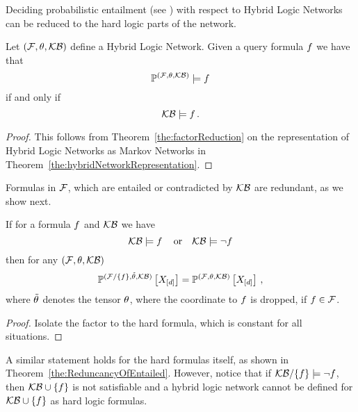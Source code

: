 
Deciding probabilistic entailment (see ) with respect to Hybrid Logic Networks can be reduced to the hard logic parts of the network.

\begin{theorem}\label{the:hlnEntailmentReduction}
	Let $(\mathcal{F},\theta,\mathcal{KB})$ define a Hybrid Logic Network.
	Given a query formula $f$ we have that 
		\[ \mathbb{P}^{(\mathcal{F},\theta,\mathcal{KB})} \models f \]
	if and only if
		\[ \mathcal{KB} \models f \, . \]
\end{theorem}
\begin{proof}
	This follows from Theorem~\ref{the:factorReduction} on the representation of Hybrid Logic Networks as Markov Networks in Theorem~\ref{the:hybridNetworkRepresentation}.
\end{proof}


Formulas in $\mathcal{F}$, which are entailed or contradicted by $\mathcal{KB}$ are redundant, as we show next.

\begin{theorem}%
	If for a formula $f$ and $\mathcal{KB}$ we have 
		\[ \mathcal{KB} \models f \, \quad \text{or} \quad \mathcal{KB} \models \lnot f \]
	then for any $(\mathcal{F},\theta,\mathcal{KB})$
		\[ \mathbb{P}^{(\mathcal{F}/\{f\},\tilde{\theta},\mathcal{KB})}\left[X_{[d]}\right] =  \mathbb{P}^{(\mathcal{F},\theta,\mathcal{KB})}\left[X_{[d]}\right]  \, , \]
	where $\tilde{\theta}$ denotes the tensor $\theta$, where the coordinate to $f$ is dropped, if $f\in\mathcal{F}$.
\end{theorem}
\begin{proof}
	Isolate the factor to the hard formula, which is constant for all situations.
\end{proof}

A similar statement holds for the hard formulas itself, as shown in Theorem~\ref{the:ReduncancyOfEntailed}.
However, notice that if $\mathcal{KB}/\{f\}\models\lnot f$, then $\mathcal{KB}\cup\{f\}$ is not satisfiable and a hybrid logic network cannot be defined for $\mathcal{KB}\cup\{f\}$ as hard logic formulas.


